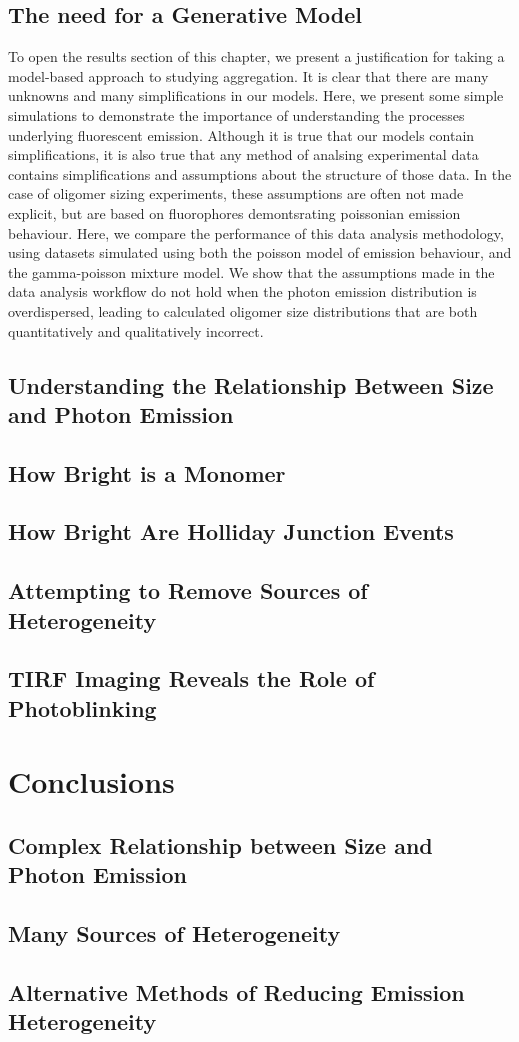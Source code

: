 \subsection{The need for a Generative Model}
To open the results section of this chapter, we present a justification for taking a model-based approach to studying aggregation. It is clear that there are many unknowns and many simplifications in our models. Here, we present some simple simulations to demonstrate the importance of understanding the processes underlying fluorescent emission. Although it is true that our models contain simplifications, it is also true that any method of analsing experimental data contains simplifications and assumptions about the structure of those data. In the case of oligomer sizing experiments, these assumptions are often not made explicit, but are based on fluorophores demontsrating poissonian emission behaviour. Here, we compare the performance of this data analysis methodology, using datasets simulated using both the poisson model of emission behaviour, and the gamma-poisson mixture model. We show that the assumptions made in the data analysis workflow do not hold when the photon emission distribution is overdispersed, leading to calculated oligomer size distributions that are both quantitatively and qualitatively incorrect.  




\subsection{Understanding the Relationship Between Size and Photon Emission}
\subsection{How Bright is a Monomer}
\subsection{How Bright Are Holliday Junction Events}
\subsection{Attempting to Remove Sources of Heterogeneity}
\subsection{TIRF Imaging Reveals the Role of Photoblinking}

\section{Conclusions}
\subsection{Complex Relationship between Size and Photon Emission}
\subsection{Many Sources of Heterogeneity}
\subsection{Alternative Methods of Reducing Emission Heterogeneity}